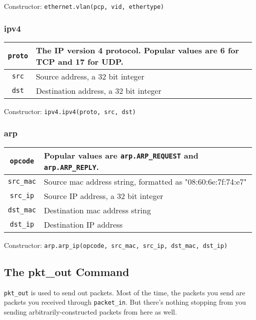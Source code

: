 \bigskip
Constructor: \texttt{ethernet.vlan(pcp, vid, ethertype)}

\subsubsection{ipv4}

\bigskip
\begin{tabularx}{\linewidth}{|c|X|}
\hline\hline
\texttt{proto} & The IP version 4 protocol.  
Popular values are  6 for TCP and 17 for UDP.
\\ \hline
\texttt{src} & Source address, a 32 bit integer 
\\ \hline
\texttt{dst} & Destination address, a 32 bit integer
\\ \hline\hline
\end{tabularx}

\bigskip
Constructor: \texttt{ipv4.ipv4(proto, src, dst)}

\subsubsection{arp}

\bigskip
\begin{tabularx}{\linewidth}{|c|X|}
\hline\hline
\texttt{opcode} & Popular values are \texttt{arp.ARP\_REQUEST} and \texttt{arp.ARP\_REPLY}.  
\\ \hline
\texttt{src\_mac} & Source mac address string, formatted as "08:60:6e:7f:74:e7"  
\\ \hline
\texttt{src\_ip} & Source IP address, a 32 bit integer  
\\ \hline
\texttt{dst\_mac} & Destination mac address string  
\\ \hline
\texttt{dst\_ip} & Destination IP address  
\\ \hline\hline
\end{tabularx}

\bigskip
Constructor: \texttt{arp.arp\_ip(opcode, src\_mac, src\_ip, dst\_mac, dst\_ip)}

\subsection{The pkt\_out Command}

\texttt{pkt\_out} is used to send out packets.  
Most of the time, the packets you send are packets you received through \texttt{packet\_in}.
But there's nothing stopping from you sending arbitrarily-constructed packets from here as well.  


